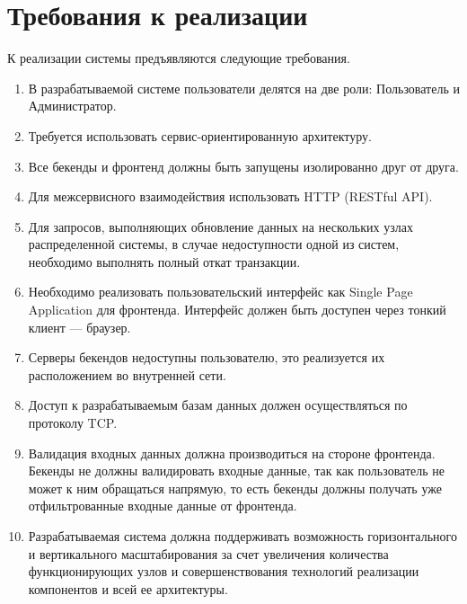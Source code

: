 \section{Требования к реализации}
К реализации системы предъявляются следующие требования.
\begin{enumerate}
	\item В разрабатываемой системе пользователи делятся на две роли: Пользователь и Администратор.
	\item Требуется использовать сервис-ориентированную архитектуру.
	\item Все бекенды и фронтенд должны быть запущены изолированно друг от друга.
	\item Для межсервисного взаимодействия использовать HTTP (RESTful API).
	\item Для запросов, выполняющих обновление данных на нескольких узлах распределенной системы, в случае недоступности одной из систем, необходимо выполнять полный откат транзакции.
	\item Необходимо реализовать пользовательский интерфейс как Single Page Application для фронтенда. Интерфейс должен быть доступен через тонкий клиент --- браузер.
	\item Серверы бекендов недоступны пользователю, это реализуется их расположением во внутренней сети.
	\item Доступ к разрабатываемым базам данных должен осуществляться по протоколу TCP.
	\item Валидация входных данных должна производиться на стороне фронтенда. Бекенды не должны валидировать входные данные, так как пользователь не может к ним обращаться напрямую, то есть бекенды должны получать уже отфильтрованные входные данные от фронтенда.
	\item Разрабатываемая система должна поддерживать возможность горизонтального и вертикального масштабирования за счет увеличения количества функционирующих узлов и совершенствования технологий реализации компонентов и всей ее архитектуры.
\end{enumerate}